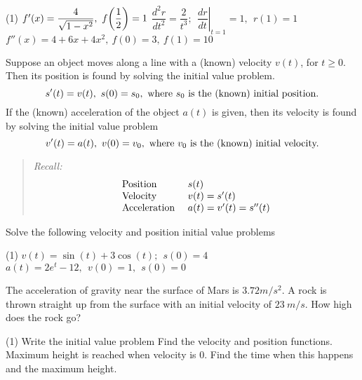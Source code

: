 \documentclass[mathNotesPreamble]{subfiles}
\begin{document}
  \begin{tasks}[after-item-skip=\stretch{1}, label=\mbox{}](1)
    \task $f'(x)=\dfrac{4}{\sqrt{1-x^2}},\ f\parens{\dfrac{1}{2}}=1$
    \task $\dfrac{d^2r}{dt^2}=\dfrac{2}{t^3};\ \ \left.\dfrac{dr}{dt}\right|_{t=1}=1,\ \ r(1)=1$
    \task $f''(x)=4+6x+4x^2,\ f(0)=3,\ f(1)=10$
  \end{tasks}
  \pagebreak

  \begin{thmBox*}
    Suppose an object moves along a line with a (known) velocity $v(t)$, for $t\geq 0$. Then its position is found by solving the initial value problem.
      \[s'(t)=v(t),\ s(0)=s_0,\ \textnormal{where }s_0\textnormal{ is the (known) initial position.}\]
    If the (known) acceleration of the object $a(t)$ is given, then its velocity is found by solving the initial value problem
      \[v'(t)=a(t),\ v(0)=v_0,\ \textnormal{where }v_0\textnormal{ is the (known) initial velocity.}\]
  \end{thmBox*}

  \begin{quote}
    \textit{Recall:}
      \[\begin{array}{ll}
          \textnormal{Position }& s(t)\\
          \textnormal{Velocity }& v(t)=s'(t)\\
          \textnormal{Acceleration }& a(t)=v'(t)=s''(t)
        \end{array}\]
  \end{quote}
  \begin{ex*}
    Solve the following velocity and position initial value problems
  \end{ex*}
  \begin{tasks}[after-item-skip=\stretch{1}, label=\mbox{}](1)
    \task $v(t)=\sin(t)+3\cos(t);\ \ s(0)=4$
    \task $a(t)=2e^t-12,\ \ v(0)=1,\ \ s(0)=0$
  \end{tasks}
  \pagebreak
  
  \begin{ex*}
    The acceleration of gravity near the surface of Mars is $3.72 m/s^2$. A rock is thrown straight up from the surface with an initial velocity of $23\ m/s$. How high does the rock go?
  \end{ex*}
  \begin{tasks}[after-item-skip=\stretch{1}](1)
    \task Write the initial value problem
    \task Find the velocity and position functions.
    \task Maximum height is reached when velocity is 0. Find the time when this happens and the maximum height.
  \end{tasks}
  \pagebreak
  
\end{document}
